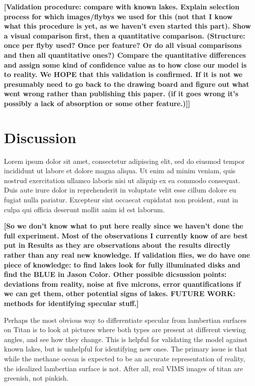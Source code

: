 \documentclass[twocolumn,linenumbers]{aastex631}
\begin{document}
\textbf{\color{red}[Validation procedure: compare with known lakes. Explain selection process for which images/flybys we used for this (not that I know what this procedure is yet, as we haven't even started this part). Show a visual comparison first, then a quantitative comparison. (Structure: once per flyby used? Once per feature? Or do all visual comparisons and then all quantitative ones?) Compare the quantitative differences and assign some kind of confidence value as to how close our model is to reality. We HOPE that this validation is confirmed. If it is not we presumably need to go back to the drawing board and figure out what went wrong rather than publishing this paper. (if it goes wrong it's possibly a lack of absorption or some other feature.)]]\color{black}}

\section{Discussion} \label{sec:discussion}

Lorem ipsum dolor sit amet, consectetur adipiscing elit, sed do eiusmod tempor incididunt ut labore et dolore magna aliqua. Ut enim ad minim veniam, quis nostrud exercitation ullamco laboris nisi ut aliquip ex ea commodo consequat. Duis aute irure dolor in reprehenderit in voluptate velit esse cillum dolore eu fugiat nulla pariatur. Excepteur sint occaecat cupidatat non proident, sunt in culpa qui officia deserunt mollit anim id est laborum.

\textbf{\color{red}[So we don't know what to put here really since we haven't done the full experiment. Most of the observations I currently know of are best put in Results as they are observations about the results directly rather than any real new knowledge. If validation flies, we do have one piece of knowledge: to find lakes look for fully illuminated disks and find the BLUE in Jason Color. Other possible dicsussion points: deviations from reality, noise at five microns, error quantifications if we can get them, other potential signs of lakes. FUTURE WORK: methods for identifying specular stuff.]
\color{black}}

Perhaps the most obvious way to differentiate specular from lambertian surfaces on Titan is to look at pictures where both types are present at different viewing angles, and see how they change. This is helpful for validating the model against known lakes, but is unhelpful for identifying new ones. The primary issue is that while the methane ocean is expected to be an accurate representation of reality, the idealized lambertian surface is not. After all, real VIMS images of titan are greenish, not pinkish. 
\end{document}

